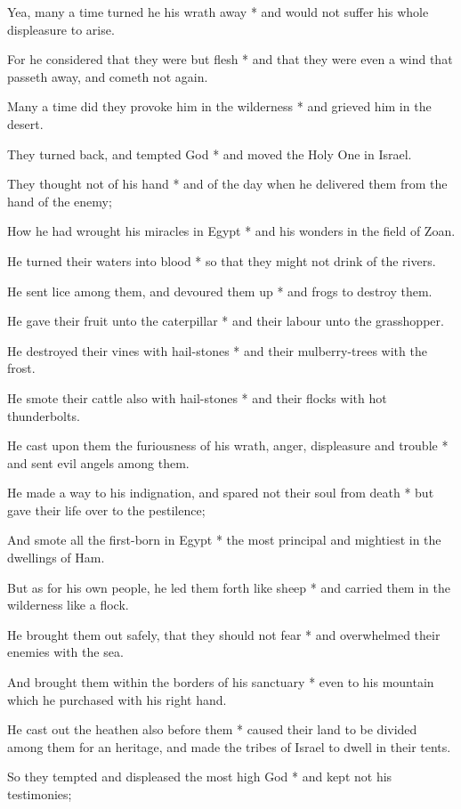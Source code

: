 Yea, many a time turned he his wrath away * and would not suffer his whole displeasure to arise.

For he considered that they were but flesh * and that they were even a wind that passeth away, and cometh not again.

Many a time did they provoke him in the wilderness * and grieved him in the desert.

They turned back, and tempted God * and moved the Holy One in Israel.

They thought not of his hand * and of the day when he delivered them from the hand of the enemy;

How he had wrought his miracles in Egypt * and his wonders in the field of Zoan.

He turned their waters into blood * so that they might not drink of the rivers.

He sent lice among them, and devoured them up * and frogs to destroy them.

He gave their fruit unto the caterpillar * and their labour unto the grasshopper.

He destroyed their vines with hail-stones * and their mulberry-trees with the frost.

He smote their cattle also with hail-stones * and their flocks with hot thunderbolts.

He cast upon them the furiousness of his wrath, anger, displeasure and trouble * and sent evil angels among them.

He made a way to his indignation, and spared not their soul from death * but gave their life over to the pestilence;

And smote all the first-born in Egypt * the most principal and mightiest in the dwellings of Ham.

But as for his own people, he led them forth like sheep * and carried them in the wilderness like a flock.

He brought them out safely, that they should not fear * and overwhelmed their enemies with the sea.

And brought them within the borders of his sanctuary * even to his mountain which he purchased with his right hand.

He cast out the heathen also before them * caused their land to be divided among them for an heritage, and made the tribes of Israel to dwell in their tents.

So they tempted and displeased the most high God * and kept not his testimonies;

